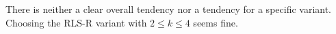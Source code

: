 There is neither a clear overall tendency nor a tendency for a specific variant.
Choosing the RLS-R variant with $2\le k\le4$ seems fine.